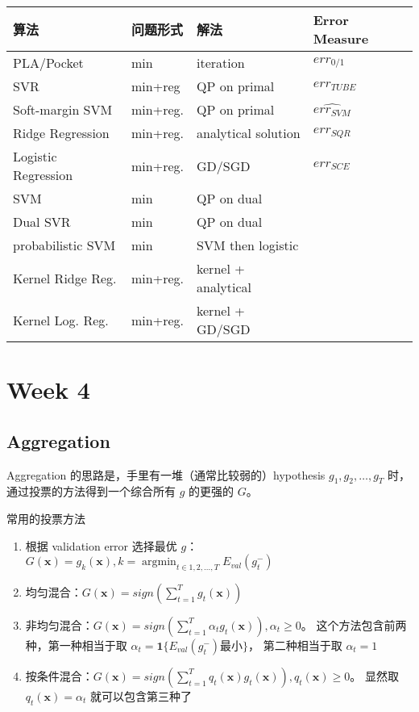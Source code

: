 \documentclass[a4paper]{article}
\begin{document}
\begin{tabular}{p{3cm}|p{3cm}|p{3cm}|p{3cm}}
\hline
算法 & 问题形式 & 解法 & Error Measure \\ 
\hline
\hline
\hline
PLA/Pocket           & min     & iteration            & $err_{0/1}$ \\
\hline
SVR                  & min+reg & QP on primal         & $err_{TUBE}$ \\
\hline
Soft-margin SVM      & min+reg. & QP on primal        & $\widehat{err_{SVM}}$ \\
\hline
Ridge Regression     & min+reg. & analytical solution & $err_{SQR}$ \\
\hline
Logistic Regression  & min+reg. & GD/SGD              & $err_{SCE}$ \\
\hline
SVM                  & min      & QP on dual          & \\
\hline
Dual SVR             & min      & QP on dual          & \\
\hline
probabilistic SVM    & min      & SVM then logistic   & \\
\hline
Kernel Ridge Reg.    & min+reg. & kernel + analytical & \\
\hline
Kernel Log. Reg.     & min+reg. & kernel + GD/SGD     & \\
\hline
\end{tabular}


\section{Week 4}
\subsection{Aggregation}
Aggregation 的思路是，手里有一堆（通常比较弱的）hypothesis $g_1, g_2, \dots, g_T$ 时，通过投票的方法得到一个综合所有 $g$ 的更强的 $G$。

常用的投票方法
\begin{enumerate}
  \item 根据 validation error 选择最优 $g$：$\displaystyle G(\mathbf{x}) = g_{k}(\mathbf{x}), k = \operatorname*{argmin}_{t \in {1, 2, \dots, T}}E_{val}(g_t^{-})$ \\
  \item 均匀混合：$G(\mathbf{x}) = sign(\sum_{t=1}^{T}g_t(\mathbf{x}))$ \\
  \item 非均匀混合：$G(\mathbf{x}) = sign(\sum_{t=1}^{T}\alpha_tg_t(\mathbf{x})), \alpha_t \ge 0$。
        这个方法包含前两种，第一种相当于取 $\alpha_t = \mathbf{1}\{E_{val}(g_t^{-}) \text{最小}\}$，
        第二种相当于取 $\alpha_t = 1$ \\
  \item 按条件混合：$G(\mathbf{x}) = sign(\sum_{t=1}^{T}q_t(\mathbf{x})g_t(\mathbf{x})), q_t(\mathbf{x}) \ge 0$。
        显然取 $q_t(\mathbf{x}) = \alpha_t$ 就可以包含第三种了
\end{enumerate}
\end{document}
